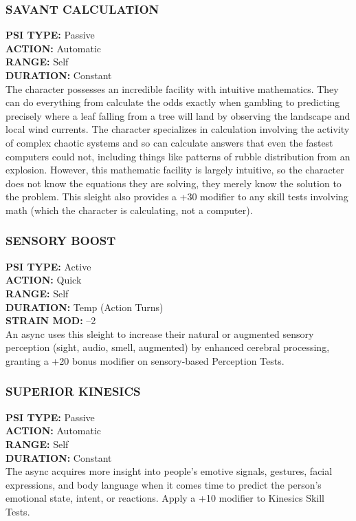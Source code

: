 \subsubsection{SAVANT CALCULATION} \textbf{PSI TYPE:} Passive \\ \textbf{ACTION:} Automatic \\ \textbf{RANGE:} Self \\ \textbf{DURATION:} Constant \\ The character possesses an incredible facility with intuitive mathematics. They can do everything from calculate the odds exactly when gambling to predicting precisely where a leaf falling from a tree will land by observing the landscape and local wind currents. The character specializes in calculation involving the activity of complex chaotic systems and so can calculate answers that even the fastest computers could not, including things like patterns of rubble distribution from an explosion. However, this mathematic facility is largely intuitive, so the character does not know the equations they are solving, they merely know the solution to the problem. This sleight also provides a +30 modifier to any skill tests involving math (which the character is calculating, not a computer). 

\subsubsection{SENSORY BOOST} \textbf{PSI TYPE:} Active \\ \textbf{ACTION:} Quick \\ \textbf{RANGE:} Self \\ \textbf{DURATION:} Temp (Action Turns) \\ \textbf{STRAIN MOD:} –2 \\ An async uses this sleight to increase their natural or augmented sensory perception (sight, audio, smell, augmented) by enhanced cerebral processing, granting a +20 bonus modifier on sensory-based Perception Tests. 

\subsubsection{SUPERIOR KINESICS} \textbf{PSI TYPE:} Passive \\ \textbf{ACTION:} Automatic \\ \textbf{RANGE:} Self \\ \textbf{DURATION:} Constant \\ The async acquires more insight into people’s emotive signals, gestures, facial expressions, and body language when it comes time to predict the person’s emotional state, intent, or reactions. Apply a +10 modifier to Kinesics Skill Tests. 


